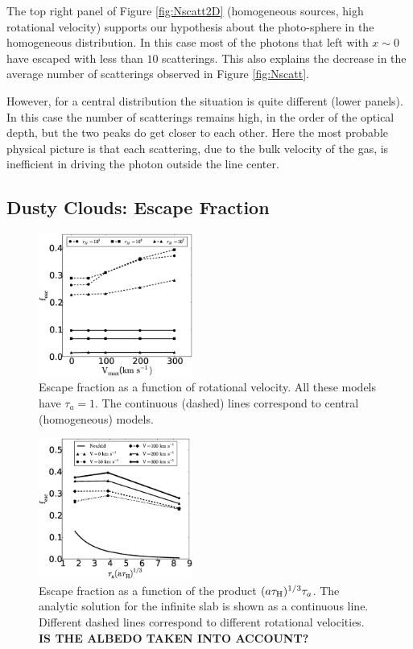 \documentclass{emulateapj}
\begin{document}
The top right panel of Figure \ref{fig:Nscatt2D} (homogeneous sources,
high rotational velocity) supports our hypothesis about
the photo-sphere in the homogeneous distribution. In this case most of
the photons that left with $x\sim 0$ have escaped with less than $10$
scatterings. This also explains the decrease in the average number of
scatterings observed in Figure \ref{fig:Nscatt}.

However, for a central distribution the situation is quite different
(lower panels). In this case the number of scatterings remains high,
in the order of the optical depth, but the two peaks do get closer to each
other. Here the most probable physical picture is that each
scattering, due to the bulk velocity of the gas, is inefficient in
driving the photon outside the line center.



\subsection{Dusty Clouds: Escape Fraction}
\label{sec:escapefraction}

\begin{figure}
  \includegraphics[width=0.45\textwidth]{f6.eps}
  \caption{Escape fraction as a function of rotational velocity. All
    these models have $\tau_{a}=1$. The continuous (dashed) lines
    correspond to central (homogeneous) models.
    \label{fig:efvsv}}
\end{figure}


\begin{figure}
  \includegraphics[width=0.45\textwidth]{f7.eps}
  \caption{Escape fraction as a function of the
    product $(a\tau_{\rm H})^{1/3}\tau_{a}$. The analytic solution for
    the infinite slab is shown as a continuous line. Different dashed
    lines correspond to different rotational velocities.
    {\bf IS THE ALBEDO TAKEN INTO ACCOUNT?}
    \label{fig:efvsNeufeld}}   
\end{figure}
\end{document}
